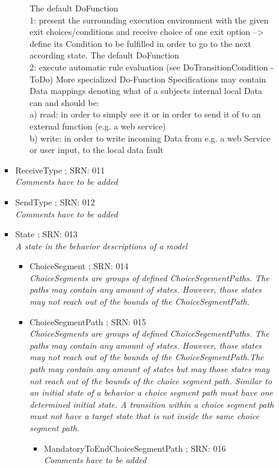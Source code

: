 \begin{itemize}
\begin{itemize}
\begin{itemize}
\begin{itemize}
{			The default DoFunction\\ 1: present the surrounding execution environment with the given exit choices/conditions and receive choice of one exit option --> define its Condition to be fulfilled in order to go to the next according state.
			The default DoFunction \\2: execute automatic rule evaluation (see DoTransitionCondition - ToDo)
			More specialized Do-Function Specifications may contain Data mappings denoting what of a subjects internal local Data can and should be:\\
			a) read: in order to simply see it or in order to send it of to an external function (e.g. a web service)\\
			b) write: in order to write incoming Data from e.g. a web Service or user input, to the local data fault}
		\end{itemize}
		\item ReceiveType ; SRN: 011 \\ \textit{Comments have to be added}
		\item SendType ; SRN: 012 \\ \textit{Comments have to be added}
		\item State ; SRN: 013 \\ \textit{A state in the behavior descriptions of a model}
		\begin{itemize}
			\item ChoiceSegment ; SRN: 014 \\ \textit{ChoiceSegments are groups of defined ChoiceSegementPaths. The paths may contain any amount of states. However, those states may not reach out of the bounds of the ChoiceSegmentPath.}
			\item ChoiceSegmentPath ; SRN: 015 \\ \textit{ChoiceSegments are groups of defined ChoiceSegementPaths. The paths may contain any amount of states. However, those states may not reach out of the bounds of the ChoiceSegmentPath.The path may contain any amount of states but may those states may not reach out of the bounds of the choice segment path. Similar to an initial state of a behavior a choice segment path must have one determined initial state. A transition within a choice segment path must not have a target state that is not inside the same choice segment path.}
			\begin{itemize}
				\item MandatoryToEndChoiceSegmentPath ; SRN: 016 \\ \textit{Comments have to be added}

\end{itemize}
\end{itemize}
\end{itemize}
\end{itemize}
\end{itemize}
